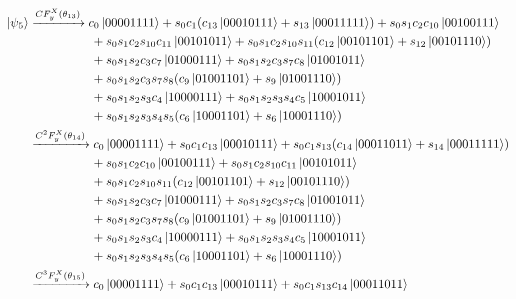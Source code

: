 \documentclass[11pt, oneside]{article}   	%
\begin{document}
\begin{align*}
\ket{\psi_5}
&\xrightarrow{CF^X_y(\theta_{13})} 
c_0 \ket{00001111} 
+ s_0 c_1 (c_{13} \ket{00010111} + s_{13} \ket{00011111})
+ s_0 s_1 c_2 c_{10} \ket{00100111} \\
& \hspace{5em} 
+ s_0 s_1 c_2 s_{10} c_{11} \ket{00101011}
+ s_0 s_1 c_2 s_{10} s_{11} (c_{12} \ket{00101101} + s_{12} \ket{00101110}) \\
& \hspace{5em} 
+ s_0 s_1 s_2 c_3 c_7 \ket{01000111}
+ s_0 s_1 s_2 c_3 s_7 c_8 \ket{01001011} \\
& \hspace{5em} 
+ s_0 s_1 s_2 c_3 s_7 s_8 (c_9 \ket{01001101} + s_9 \ket{01001110}) \\
& \hspace{5em} 
+ s_0 s_1 s_2 s_3 c_4 \ket{10000111}
+ s_0 s_1 s_2 s_3 s_4 c_5 \ket{10001011} \\
& \hspace{5em} 
+ s_0 s_1 s_2 s_3 s_4 s_5 (c_6 \ket{10001101} + s_6 \ket{10001110} ) \\
&\xrightarrow{C^2 F^X_y(\theta_{14})} 
c_0 \ket{00001111} 
+ s_0 c_1 c_{13} \ket{00010111}
+ s_0 c_1 s_{13} (c_{14} \ket{00011011} + s_{14} \ket{00011111}) \\
& \hspace{5em} 
+ s_0 s_1 c_2 c_{10} \ket{00100111} 
+ s_0 s_1 c_2 s_{10} c_{11} \ket{00101011} \\
& \hspace{5em} 
+ s_0 s_1 c_2 s_{10} s_{11} (c_{12} \ket{00101101} + s_{12} \ket{00101110}) \\
& \hspace{5em} 
+ s_0 s_1 s_2 c_3 c_7 \ket{01000111}
+ s_0 s_1 s_2 c_3 s_7 c_8 \ket{01001011} \\
& \hspace{5em} 
+ s_0 s_1 s_2 c_3 s_7 s_8 (c_9 \ket{01001101} + s_9 \ket{01001110}) \\
& \hspace{5em} 
+ s_0 s_1 s_2 s_3 c_4 \ket{10000111}
+ s_0 s_1 s_2 s_3 s_4 c_5 \ket{10001011} \\
& \hspace{5em} 
+ s_0 s_1 s_2 s_3 s_4 s_5 (c_6 \ket{10001101} + s_6 \ket{10001110} ) \\
&\xrightarrow{C^3 F^X_y(\theta_{15})} 
c_0 \ket{00001111} 
+ s_0 c_1 c_{13} \ket{00010111}
+ s_0 c_1 s_{13} c_{14} \ket{00011011} \\
& \hspace{5em} 

\end{align*}
\end{document}
